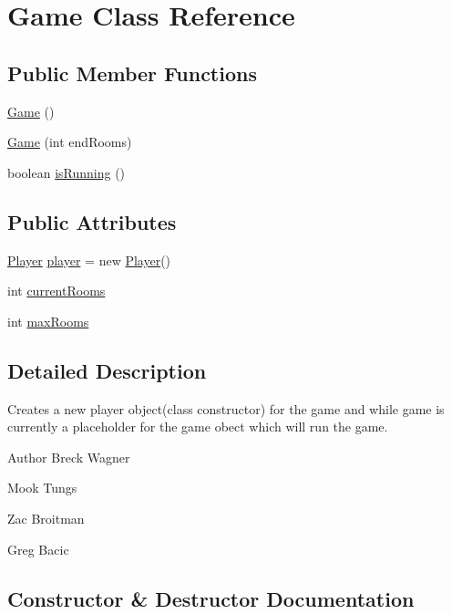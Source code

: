 \hypertarget{class_game}{}\section{Game Class Reference}
\label{class_game}
\subsection*{Public Member Functions}
\begin{DoxyCompactItemize}
\item 
\hyperlink{class_game_a2e034e53e9c032964ecd2a831b29a616}{Game} ()
\item 
\hyperlink{class_game_a562ff3d3722644681c165b571c77e493}{Game} (int end\+Rooms)
\item 
boolean \hyperlink{class_game_a379992cc9373a228b47c7ed398fc82a3}{is\+Running} ()
\end{DoxyCompactItemize}
\subsection*{Public Attributes}
\begin{DoxyCompactItemize}
\item 
\hyperlink{class_player}{Player} \hyperlink{class_game_abca4659998fe751258381792e922f138}{player} = new \hyperlink{class_player}{Player}()
\item 
int \hyperlink{class_game_a6c971d217035a9afd591a2fef942593d}{current\+Rooms}
\item 
int \hyperlink{class_game_a35d7485500ee1c2ec4ec93201aebddbb}{max\+Rooms}
\end{DoxyCompactItemize}


\subsection{Detailed Description}
Creates a new player object(class constructor) for the game and while game is currently a placeholder for the game obect which will run the game. \begin{DoxyAuthor}{Author}
Breck Wagner 

Mook Tungs 

Zac Broitman 

Greg Bacic 
\end{DoxyAuthor}


\subsection{Constructor \& Destructor Documentation}
\hypertarget{class_game_a2e034e53e9c032964ecd2a831b29a616}{}
